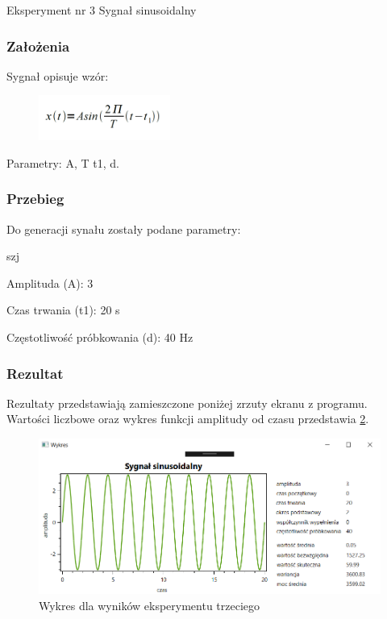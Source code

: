 \documentclass[12pt]{article}
\begin{document}
Eksperyment nr 3 Sygnał sinusoidalny

\subsubsection{Założenia}
Sygnał opisuje wzór:

\begin{figure}[h!]
 \centering
 \includegraphics[width=4.3cm]{SinWzor.PNG}
 \vspace{-0.3cm}
 \label{gw}
\end{figure}

Parametry: A, T t1, d.


\subsubsection{Przebieg}
Do generacji synału zostały podane parametry:

\begin{labeling}{szj}
\item [Amplituda (A):] 3
\item [Czas trwania (t1):] 20 s
\item [Częstotliwość próbkowania (d): ] 40 Hz
\end{labeling}


\subsubsection{Rezultat}

Rezultaty przedstawiają zamieszczone poniżej zrzuty ekranu z programu. Wartości liczbowe oraz wykres funkcji amplitudy od czasu przedstawia \ref{Wykres dla wyników eksperymentu trzeciego}.
\begin{figure}[h!]
 \centering
 \includegraphics[width=12.3cm]{Sin.PNG}
 \vspace{-0.3cm}
 \caption{Wykres dla wyników eksperymentu trzeciego}
 \label{Wykres dla wyników eksperymentu trzeciego}
\end{figure}
\end{document}
